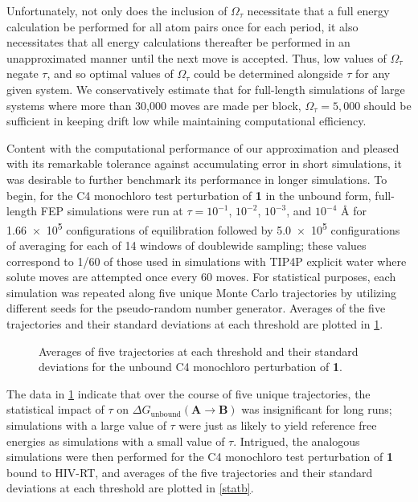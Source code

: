 \documentclass[12pt]{report}
\begin{document}
Unfortunately, not only does the inclusion of $\Omega_\tau$ necessitate that a full energy calculation be performed for all atom pairs once for each period, it also necessitates that all energy calculations thereafter be performed in an unapproximated manner until the next move is accepted. Thus, low values of $\Omega_\tau$ negate $\tau$, and so optimal values of $\Omega_\tau$ could be determined alongside $\tau$ for any given system. We conservatively estimate that for full-length simulations of large systems where more than 30,000 moves are made per block, $\Omega_\tau = 5,000$ should be sufficient in keeping drift low while maintaining computational efficiency.

Content with the computational performance of our approximation and pleased with its remarkable tolerance against accumulating error in short simulations, it was desirable to further benchmark its performance in longer simulations. To begin, for the C4 monochloro test perturbation of \textbf{1} in the unbound form, full-length FEP simulations were run at $\tau = 10^{-1}$, $10^{-2}$, $10^{-3}$, and $10^{-4}$ \AA{} for \num{1.66e5} configurations of equilibration followed by \num{5.0e5} configurations of averaging for each of 14 windows of doublewide sampling; these values correspond to 1/60 of those used in simulations with TIP4P explicit water where solute moves are attempted once every 60 moves. For statistical purposes, each simulation was repeated along five unique Monte Carlo trajectories by utilizing different seeds for the pseudo-random number generator. Averages of the five trajectories and their standard deviations at each threshold are plotted in \cref{statun}.

\begin{figure}[htbp]
\centering

\caption{Averages of five trajectories at each threshold and their standard deviations for the unbound C4 monochloro perturbation of \textbf{1}.}
\label{statun}
\end{figure}

The data in \cref{statun} indicate that over the course of five unique trajectories, the statistical impact of $\tau$ on 
$\Delta G_{\textrm{unbound}}(\textbf{A} \longrightarrow \textbf{B})$ was insignificant for long runs; simulations with a large value of $\tau$ were just as likely to yield reference free energies as simulations with a small value of $\tau$. Intrigued, the analogous simulations were then performed for the C4 monochloro test perturbation of \textbf{1} bound to HIV-RT, and averages of the five trajectories and their standard deviations at each threshold are plotted in \cref{statb}.
\end{document}
